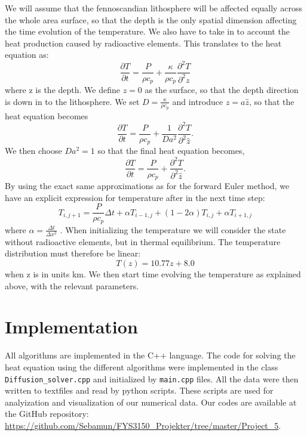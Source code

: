 \documentclass{article}
\begin{document}
\begin{multicols}{2}
We will assume that the fennoscandian lithosphere will be affected equally across the whole area surface, so that the depth is the only spatial dimension affecting the time evolution of the temperature. We also have to take in to account the heat production caused by radioactive elements. This translates to the heat equation as:
\begin{equation}
	\frac{\partial T}{\partial t}= \frac{P}{\rho c_p} + \frac{\kappa}{\rho c_p}\frac{\partial^2 T}{\partial^2 z}
\end{equation}
where z is the depth. We define $z=0$ as the surface, so that the depth direction is down in to the lithosphere. We set $D=\frac{\kappa}{\rho c_p}$ and introduce $z=a\hat{z}$, so that the heat equation becomes
\begin{equation}
	\frac{\partial T}{\partial t}=\frac{P}{\rho c_p}+\frac{1}{D a^2}\frac{\partial^2 T}{\partial^2 \hat{z}}.
\end{equation}
We then choose $Da^2=1$ so that the final heat equation becomes,
\begin{equation}
	\frac{\partial T}{\partial t}=\frac{P}{\rho c_p}+\frac{\partial^2 T}{\partial^2 \hat{z}}.
\end{equation}
By using the exact same approximations as for the forward Euler method, we have an explicit expression for temperature after in the next time step:
\begin{equation}
	T_{i,j+1}= \frac{P}{\rho c_p}\Delta t + \alpha T_{i-1,j}+(1-2\alpha )T_{i,j} + \alpha T_{i+1, j}
\end{equation}
where $\alpha=\frac{\Delta t}{\Delta x ^2}$ . 
When initializing the temperature we will consider the state without radioactive elements, but in thermal equilibrium. The temperature distribution must therefore be linear:
\begin{equation}
	T(z) = 10.77z + 8.0
\end{equation}
when z is in units km. We then start time evolving the temperature as explained above, with the relevant parameters. 


\section{Implementation}

All algorithms are implemented in the C++ language. The code for solving the heat equation using the different algorithms were implemented in the class \texttt{Diffusion{\_}solver.cpp} and initialized by \texttt{main.cpp} files. All the data were then written to textfiles and read by python scripts. These scripts are used for analyization and visualization of our numerical data. Our codes are available at the GitHub repository: \url{https://github.com/Sebamun/FYS3150_Projekter/tree/master/Project_5}.


\end{multicols}
\end{document}
